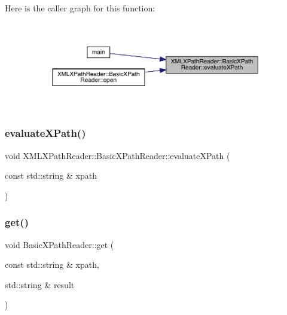 Here is the caller graph for this function\+:\nopagebreak
\begin{figure}[H]
\begin{center}
\leavevmode
\includegraphics[width=350pt]{d6/dbf/classXMLXPathReader_1_1BasicXPathReader_a0d2f7c3da72b0669541bef2e1d35f973_icgraph}
\end{center}
\end{figure}
\mbox{\label{classXMLXPathReader_1_1BasicXPathReader_a4aaa7102c9f6a8d5ca3adc574f06ce8b}} 
\subsubsection{\texorpdfstring{evaluateXPath()}{evaluateXPath()}\hspace{0.1cm}{\footnotesize\ttfamily [2/2]}}
{\footnotesize\ttfamily void X\+M\+L\+X\+Path\+Reader\+::\+Basic\+X\+Path\+Reader\+::evaluate\+X\+Path (\begin{DoxyParamCaption}\item[{const std\+::string \&}]{xpath }\end{DoxyParamCaption})}

\mbox{\label{classXMLXPathReader_1_1BasicXPathReader_a167f3e878414daf1c5804ee1de3235e9}} 
\subsubsection{\texorpdfstring{get()}{get()}\hspace{0.1cm}{\footnotesize\ttfamily [1/20]}}
{\footnotesize\ttfamily void Basic\+X\+Path\+Reader\+::get (\begin{DoxyParamCaption}\item[{const std\+::string \&}]{xpath,  }\item[{std\+::string \&}]{result }\end{DoxyParamCaption})}

